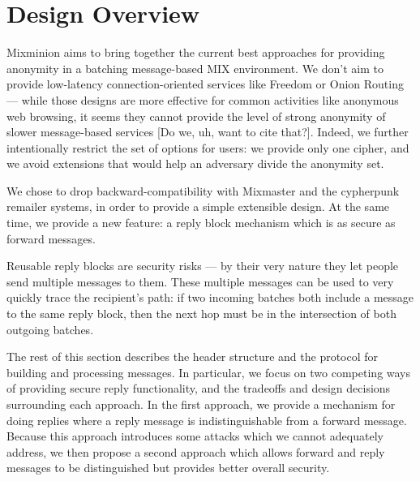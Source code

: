 \documentclass{llncs}
\begin{document}

\section{Design Overview}
\label{sec:design}

Mixminion aims to bring together the current best approaches for providing
anonymity in a batching message-based MIX environment. We don't aim
to provide low-latency connection-oriented services like Freedom
\cite{freedom} or Onion Routing \cite{onion-routing} --- while those
designs are more effective for common activities like anonymous web
browsing, it seems they cannot provide the level of strong anonymity of
slower message-based services [Do we, uh, want to cite that?]. Indeed, we
further intentionally restrict the set of options for users: we provide
only one cipher, and we avoid extensions that would help an adversary
divide the anonymity set.

We chose to drop backward-compatibility with Mixmaster and the cypherpunk
remailer systems, in order to provide a simple extensible design. At
the same time, we provide a new feature: a reply block mechanism which
is as secure as forward messages.

Reusable reply blocks are security risks --- by their very nature they
let people send multiple messages to them. These multiple messages can be
used to very quickly trace the recipient's path: if two incoming batches
both include a message to the same reply block, then the next hop must
be in the intersection of both outgoing batches.


The rest of this section describes the header structure and the
protocol for building and processing messages. In particular, we
focus on two competing ways of providing secure reply functionality,
and the tradeoffs and design decisions surrounding each approach. In
the first approach, we provide a mechanism for doing replies where a
reply message is indistinguishable from a forward message. Because this
approach introduces some attacks which we cannot adequately address, we
then propose a second approach which allows forward and reply messages
to be distinguished but provides better overall security.
\end{document}
